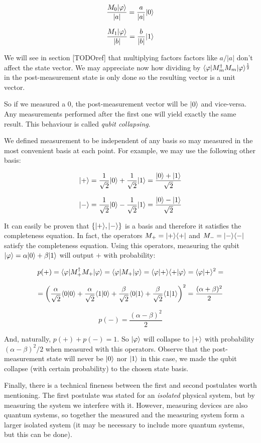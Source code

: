 $$ \frac{M_0|\varphi\rangle}{|a|} = \frac{a}{|a|}|0\rangle$$

$$ \frac{M_1|\varphi\rangle}{|b|} = \frac{b}{|b|}|1\rangle$$

We will see in section [TODOref] that multiplying factors factors like $a/|a|$ don't affect the state vector. We may appreciate now how dividing by $\langle\varphi|M_m^\dagger M_m|\varphi\rangle^{\frac{1}{2}}$ in the post-measurement state is only done so the resulting vector is a unit vector.

So if we measured a 0, the post-measurement vector will be $|0\rangle$ and vice-versa. Any measurements performed after the first one will yield exactly the same result. This behaviour is called \emph{qubit collapsing}.

We defined measurement to be independent of any basis so may measured in the most convenient basis at each point. For example, we may use the following other basis:

$$ |+\rangle = \frac{1}{\sqrt{2}}|0\rangle + \frac{1}{\sqrt{2}}|1\rangle = \frac{|0\rangle + |1\rangle}{\sqrt{2}} $$

$$ |-\rangle = \frac{1}{\sqrt{2}}|0\rangle - \frac{1}{\sqrt{2}}|1\rangle = \frac{|0\rangle - |1\rangle}{\sqrt{2}} $$

It can easily be proven that $\{|+\rangle, |-\rangle\}$ is a basis and therefore it satisfies the completeness equation. In fact, the operators $M_+ = |+\rangle\langle +|$ and $M_- = |-\rangle\langle -|$ satisfy the completeness equation. Using this operators, measuring the qubit $|\varphi\rangle = \alpha|0\rangle + \beta|1\rangle$ will output $+$ with probability:

$$ p(+) = \langle\varphi|M_+^\dagger M_+|\varphi\rangle = \langle\varphi|M_+|\varphi\rangle = \langle\varphi|+\rangle\langle+|\varphi\rangle = \langle\varphi|+\rangle^2 = $$

$$ = \bigg ( \frac{\alpha}{\sqrt{2}}\langle0|0\rangle + \frac{\alpha}{\sqrt{2}}\langle1|0\rangle + \frac{\beta}{\sqrt{2}}\langle0|1\rangle + \frac{\beta}{\sqrt{2}}\langle1|1\rangle \bigg )^2 = \frac{(\alpha + \beta)^2}{2} $$

$$ p(-) = \frac{(\alpha - \beta)^2}{2} $$

And, naturally, $p(+) + p(-) = 1$. So $|\varphi\rangle$ will collapse to $|+\rangle$ with probability $(\alpha - \beta)^2/2$ when measured with this operators. Observe that the post-measurement state will never be $|0\rangle$ nor $|1\rangle$ in this case, we made the qubit collapse (with certain probability) to the chosen state basis.

Finally, there is a technical fineness between the first and second postulates worth mentioning. The first postulate was stated for an \emph{isolated} physical system, but by measuring the system we interfere with it. However, measuring devices are also quantum systems, so together the measured and the measuring system form a larger isolated system (it may be necessary to include more quantum systems, but this can be done).


